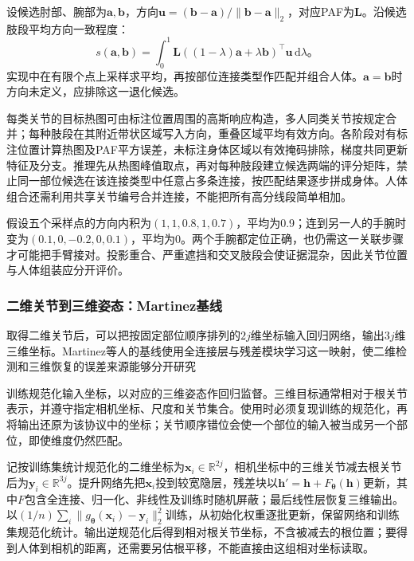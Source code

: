 设候选肘部、腕部为$\bm{a},\bm{b}$，方向$\bm{u}=(\bm{b}-\bm{a})/\lVert\bm{b}-\bm{a}\rVert_2$，对应PAF为$\bm{L}$。沿候选肢段平均方向一致程度：
\begin{equation}
 s(\bm{a},\bm{b})=
 \int_0^1
 \bm{L}((1-\lambda)\bm{a}+\lambda\bm{b})^\top
 \bm{u}\,\mathrm{d}\lambda\text{。}
 \label{eq:vision-paf-score}
\end{equation}
实现中在有限个点上采样求平均，再按部位连接类型作匹配并组合人体。$\bm{a}=\bm{b}$时方向未定义，应排除这一退化候选。

每类关节的目标热图可由标注位置周围的高斯响应构造，多人同类关节按规定合并；每种肢段在其附近带状区域写入方向，重叠区域平均有效方向。各阶段对有标注位置计算热图及PAF平方误差，未标注身体区域以有效掩码排除，梯度共同更新特征及分支。推理先从热图峰值取点，再对每种肢段建立候选两端的评分矩阵，禁止同一部位候选在该连接类型中任意占多条连接，按匹配结果逐步拼成身体。人体组合还需利用共享关节编号合并连接，不能把所有高分线段简单相加。

假设五个采样点的方向内积为$(1,1,0.8,1,0.7)$，平均为0.9；连到另一人的手腕时变为$(0.1,0,-0.2,0,0.1)$，平均为0。两个手腕都定位正确，也仍需这一关联步骤才可能把手臂接对。投影重合、严重遮挡和交叉肢段会使证据混杂，因此关节位置与人体组装应分开评价。

\subsubsection{二维关节到三维姿态：Martinez基线}
\label{sec:vision-recognition-lifting}

取得二维关节后，可以把按固定部位顺序排列的$2j$维坐标输入回归网络，输出$3j$维三维坐标。Martinez等人的基线使用全连接层与残差模块学习这一映射，使二维检测和三维恢复的误差来源能够分开研究

训练规范化输入坐标，以对应的三维姿态作回归监督。三维目标通常相对于根关节表示，并遵守指定相机坐标、尺度和关节集合。使用时必须复现训练的规范化，再将输出还原为该协议中的坐标；关节顺序错位会使一个部位的输入被当成另一个部位，即使维度仍然匹配。

记按训练集统计规范化的二维坐标为$\bm{x}_i\in\mathbb{R}^{2j}$，相机坐标中的三维关节减去根关节后为$\bm{y}_i\in\mathbb{R}^{3j}$。提升网络先把$\bm{x}_i$投到较宽隐层，残差块以$\bm{h}'=\bm{h}+F_{\bm{\theta}}(\bm{h})$更新，其中$F$包含全连接、归一化、非线性及训练时随机屏蔽；最后线性层恢复三维输出。以$(1/n)\sum_i\lVert g_{\bm{\theta}}(\bm{x}_i)-\bm{y}_i\rVert_2^2$训练，从初始化权重逐批更新，保留网络和训练集规范化统计。输出逆规范化后得到相对根关节坐标，不含被减去的根位置；要得到人体到相机的距离，还需要另估根平移，不能直接由这组相对坐标读取。

